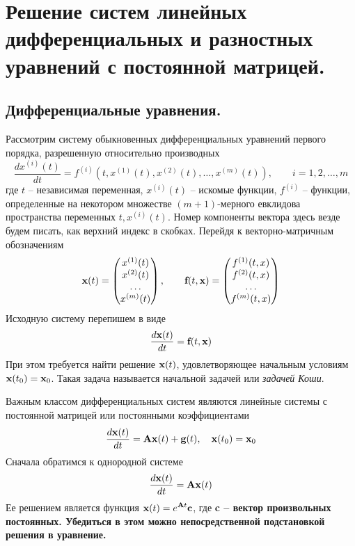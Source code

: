 \section{Решение систем линейных дифференциальных и разностных уравнений с постоянной матрицей.}\label{sec:ch18}

\subsection{Дифференциальные уравнения.}
Рассмотрим систему обыкновенных дифференциальных уравнений первого порядка, разрешенную относительно
производных
\begin{equation*}
    \frac{dx^{(i)}(t)}{dt} = f^{(i)}\left( t, x^{(1)}(t), x^{(2)}(t), \dots, x^{(m)}(t) \right), \qquad i=1,2,\dots,m
\end{equation*}
где $t$ -- независимая переменная, $\displaystyle x^{(i)}(t)$ -- искомые функции,
$\displaystyle f^{(i)}$ -- функции, определенные на некотором множестве $(m+1)$-мерного евклидова пространства
переменных $t, x^{(i)}(t)$. Номер компоненты вектора здесь везде будем писать, как верхний индекс в скобках.
Перейдя к векторно-матричным обозначениям
\begin{equation*}
    \bf{x}(t) =
    \begin{pmatrix}
        x^{(1)}(t) \\
        x^{(2)}(t) \\
        \dots      \\
        x^{(m)}(t)
    \end{pmatrix}
    , \qquad
    \bf{f}(t, \bf{x}) =
    \begin{pmatrix}
        f^{(1)}(t, x) \\
        f^{(2)}(t, x) \\
        \dots         \\
        f^{(m)}(t, x) \\
    \end{pmatrix}
\end{equation*}
Исходную систему перепишем в виде
\begin{equation}
    \frac{d\bf{x}(t)}{dt} = \bf{f}(t, \bf{x}) \label{eq:matrix_differential_equation_definition}
\end{equation}
При этом требуется найти решение $\bf{x}(t)$, удовлетворяющее начальным условиям $\displaystyle \bf{x}(t_0) = \bf{x}_0$.
Такая задача называется начальной задачей или \emph{задачей Коши}.

Важным классом дифференциальных систем являются линейные системы с постоянной матрицей или постоянными коэффициентами
\begin{equation}
    \frac{d\bf{x}(t)}{dt} = \bf{A}\bf{x}(t) + \bf{g}(t), \quad \bf{x}(t_0) = \bf{x}_0
\end{equation}
Сначала обратимся к однородной системе
\begin{equation*}
    \frac{d\bf{x}(t)}{dt} = \bf{A}\bf{x}(t)
\end{equation*}
Ее решением является функция $\displaystyle \bf{x}(t) = e^{\bf{A}t} \bf{c}$, где \bf{c} -- вектор произвольных
постоянных. Убедиться в этом можно непосредственной подстановкой решения в уравнение.
\vspace{10pt}

